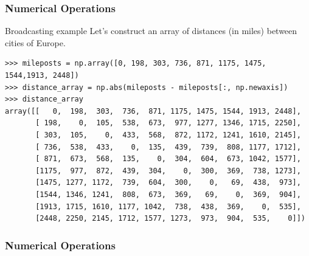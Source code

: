 \documentclass[colorlinks]{beamer}
\begin{document}
\begin{frame}[fragile]\frametitle{Numerical Operations}
\begin{block}{Broadcasting example}
Let’s construct an array of distances (in miles) between cities of Europe.
\tiny
\begin{verbatim}
>>> mileposts = np.array([0, 198, 303, 736, 871, 1175, 1475, 1544,1913, 2448])
>>> distance_array = np.abs(mileposts - mileposts[:, np.newaxis])
>>> distance_array
array([[   0,  198,  303,  736,  871, 1175, 1475, 1544, 1913, 2448],
       [ 198,    0,  105,  538,  673,  977, 1277, 1346, 1715, 2250],
       [ 303,  105,    0,  433,  568,  872, 1172, 1241, 1610, 2145],
       [ 736,  538,  433,    0,  135,  439,  739,  808, 1177, 1712],
       [ 871,  673,  568,  135,    0,  304,  604,  673, 1042, 1577],
       [1175,  977,  872,  439,  304,    0,  300,  369,  738, 1273],
       [1475, 1277, 1172,  739,  604,  300,    0,   69,  438,  973],
       [1544, 1346, 1241,  808,  673,  369,   69,    0,  369,  904],
       [1913, 1715, 1610, 1177, 1042,  738,  438,  369,    0,  535],
       [2448, 2250, 2145, 1712, 1577, 1273,  973,  904,  535,    0]])
\end{verbatim}


\end{block}

\end{frame}

\begin{frame}[fragile]\frametitle{Numerical Operations}

\end{frame}
\end{document}
